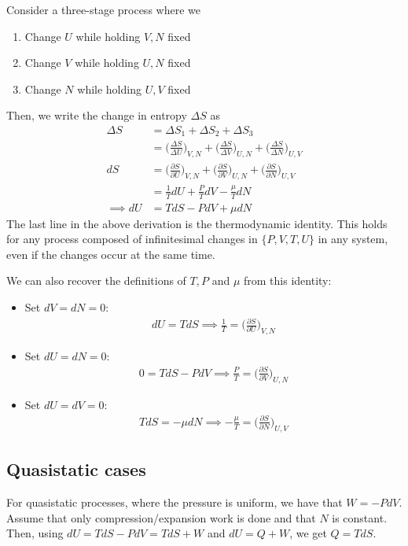 \documentclass[11pt]{article}
\begin{document}
Consider a three-stage process where we 
\begin{enumerate}
    \item Change $U$ while holding $V,N$ fixed
    \item Change $V$ while holding $U, N$ fixed
    \item Change $N$ while holding $U,V$ fixed
\end{enumerate}
Then, we write the change in entropy $\Delta S$ as 
\begin{align*}
    \Delta S &= \Delta S_1 + \Delta S_2 + \Delta S_3 \\
    &= \Big(\frac{\Delta S}{\Delta U}\Big)_{V,N} + \Big(\frac{\Delta S}{\Delta V}\Big)_{U,N} + \Big(\frac{\Delta S}{\Delta N}\Big)_{U,V} \\
    dS&= \Big(\frac{\partial  S}{\partial U}\Big)_{V,N} + \Big(\frac{\partial S}{\partial V}\Big)_{U,N} + \Big(\frac{\partial S}{\partial N}\Big)_{U,V} \\
    &= \frac{1}{T}dU + \frac{P}{T}dV - \frac{\mu}{T}dN \\
    \implies dU &= TdS - PdV + \mu dN
\end{align*}
The last line in the above derivation is the thermodynamic identity. This holds for any process composed of infinitesimal changes in $\{P,V,T,U\}$ in any system, even if the changes occur at the same time. 

We can also recover the definitions of $T,P$ and $\mu$ from this identity: 
\begin{itemize}
    \item Set $dV = dN = 0$: 
    \begin{align*}
        dU = TdS \implies \frac{1}{T} = \Big(\frac{\partial S}{\partial U} \Big)_{V,N}
    \end{align*}
    \item Set $dU = dN = 0$: 
    \begin{align*}
        0 = TdS - PdV \implies \frac{P}{T} = \Big(\frac{\partial S}{\partial V} \Big)_{U,N}
    \end{align*}
    \item Set $dU = dV = 0$: 
    \begin{align*}
        TdS = -\mu dN \implies -\frac{\mu}{T} = \Big(\frac{\partial S}{\partial N}\Big)_{U,V}
    \end{align*}
\end{itemize}

\subsection{Quasistatic cases}
For quasistatic processes, where the pressure is uniform, we have that $W = -P dV$. Assume that only compression/expansion work is done and that $N$ is constant. Then, using $dU = TdS - PdV = TdS + W$ and $dU = Q + W$, we get $Q = TdS$. 
\end{document}

